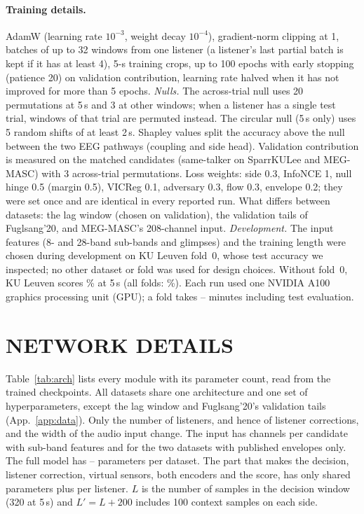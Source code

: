 \documentclass[twoside]{article}
\begin{document}
\paragraph{Training details.} AdamW (learning rate $10^{-3}$, weight decay $10^{-4}$),
gradient-norm clipping at 1, batches of up to 32 windows from one listener (a listener's
last partial batch is kept if it has at least 4), 5-s training crops, up to 100 epochs with
early stopping (patience 20) on validation contribution, learning rate halved when it has not
improved for more than 5 epochs. \emph{Nulls.} The across-trial null uses 20 permutations at 5\,s and 3 at other windows;
when a listener has a single test trial, windows of that trial are permuted instead. The
circular null (5\,s only) uses 5 random shifts of at least 2\,s. Shapley values split the
accuracy above the null between the two EEG pathways (coupling and side head). Validation contribution is measured on the matched
candidates (same-talker on SparrKULee and MEG-MASC) with 3 across-trial permutations. Loss
weights: side 0.3, InfoNCE 1, null hinge 0.5 (margin 0.5), VICReg 0.1, adversary 0.3, flow
0.3, envelope 0.2; they were set once and are identical in every reported run. What differs
between datasets: the lag window (chosen on validation), the validation tails of Fuglsang'20,
and MEG-MASC's 208-channel input. \emph{Development.} The input features (8- and 28-band
sub-bands and glimpses) and the training length were chosen during development on KU Leuven
fold~0, whose test accuracy we inspected; no other dataset or fold was used for design
choices. Without fold~0, KU Leuven scores \kulExFoldZero\% at 5\,s (all folds:
\cfKUL\%). Each run used one NVIDIA A100 graphics processing unit (GPU); a fold takes
\trainMinMin--\trainMinMax{} minutes including test evaluation.

\begin{table}[h]\centering\small
\caption{Canonical 64 vs.\ all native channels (5-s and trial accuracy, \%; 125-ms lag
window, seed 0).}
\label{tab:channels}
\end{table}

\section{NETWORK DETAILS}\label{app:net}

Table~\ref{tab:arch} lists every module with its parameter count, read from the trained
checkpoints. All datasets share one architecture and one set of hyperparameters, except the lag window and
Fuglsang'20's validation tails (App.~\ref{app:data}). Only the
number of listeners, and hence of listener corrections, and the width of the audio input
change. The input has \archAudIn{} channels per candidate with sub-band features and
\archAudInEnv{} for the two datasets with published envelopes only. The full model has
\archTotMin--\archTotMax{} parameters per dataset. The part that makes the decision,
listener correction, virtual sensors, both encoders and the score, has only \archDecision{}
shared parameters plus \archPerListener{} per listener. $L$ is the number of samples in the decision window
(320 at 5\,s) and $L'=L+200$ includes 100 context samples on each side.
\end{document}

